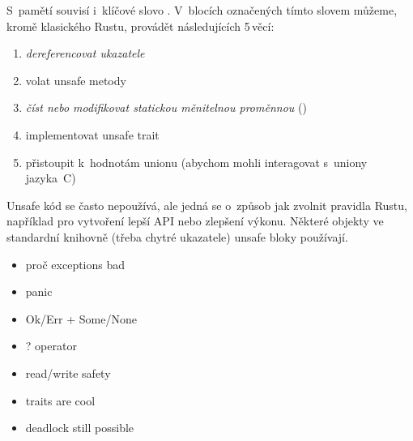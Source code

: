 \documentclass[main.tex]{subfiles}
\begin{document}

S~pamětí souvisí i~klíčové slovo . V~blocích označených tímto slovem můžeme,
kromě klasického  Rustu, provádět následujících 5\,věcí:
\begin{enumerate}
    \item \emph{dereferencovat ukazatele}
    \item volat unsafe metody
    \item \emph{číst nebo modifikovat statickou měnitelnou proměnnou} ()
    \item implementovat unsafe trait
    \item přistoupit k~hodnotám unionu (abychom mohli interagovat s~uniony jazyka~C)
\end{enumerate}

Unsafe kód se často nepoužívá, ale jedná se o~způsob jak zvolnit pravidla Rustu, například
pro vytvoření lepší API nebo zlepšení výkonu. Některé objekty ve standardní knihovně
(třeba chytré ukazatele) unsafe bloky používají. \cite[sekce\,19.1]{thebook}

\begin{itemize}
    \item proč exceptions bad
    \item panic
    \item Ok/Err + Some/None
    \item ? operator
\end{itemize}
\begin{itemize}
    \item read/write safety
    \item traits are cool
    \item deadlock still possible
\end{itemize}
\end{document}
